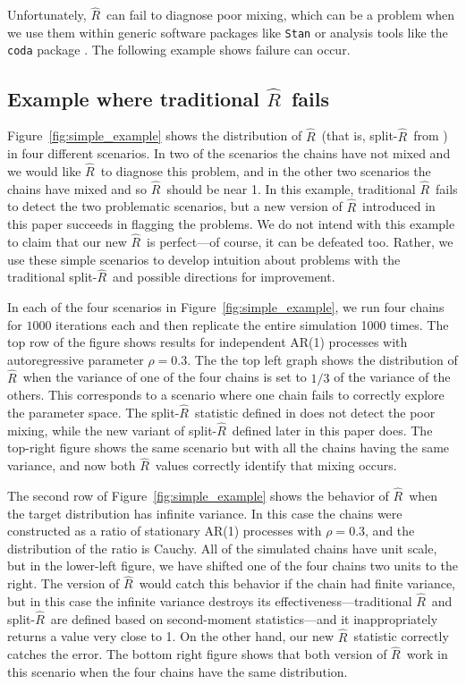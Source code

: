 \documentclass[american,]{article}
\newcommand{\Rhat}{$\widehat{R}$}
\newcommand{\sRhat}{split-$\widehat{R}$}
\theoremstyle{definition}
\begin{document}
Unfortunately, \Rhat\ can fail to diagnose poor mixing, which can be a problem when we use them 
within generic software packages like \texttt{Stan} \citep{Stan:JSS:2017} or 
analysis tools like the \texttt{coda} package \citep{coda2006}. The following example shows
failure can occur.

\subsection{Example where traditional \Rhat\ fails}

  Figure~\ref{fig:simple_example} shows the distribution of \Rhat\  (that is, \sRhat\ from \cite{BDA3})   in four different scenarios.  In two of the scenarios the chains have not mixed and we would like \Rhat\  to diagnose this problem, and in the other two scenarios the chains have mixed and so  \Rhat\ should be near 1.  In this example, traditional \Rhat\  fails to detect the two problematic scenarios, but a new version  of \Rhat\  introduced in this paper succeeds in flagging the problems. We do not intend with this example to claim that our new \Rhat\ is perfect---of course, it can be defeated too.  Rather, we use these simple scenarios to develop intuition about problems with the traditional  \sRhat\  and possible directions for improvement.

In each of the four scenarios in  Figure~\ref{fig:simple_example}, we run four chains for $1000$ iterations each and then replicate the entire simulation 1000 times. The top row of the figure shows results for independent AR(1) processes with autoregressive parameter $\rho=0.3$. The the top left graph shows the distribution of \Rhat\ when the variance of one of the four chains is set to $1/3$ of the variance of the others. This corresponds to a scenario where one chain fails to correctly explore the parameter space. The \sRhat\ statistic defined in \citet{BDA3}  does not detect the poor mixing, while the new variant of \sRhat\ defined later in this paper does. The top-right figure shows the same scenario but with all the chains having the same variance, and now both \Rhat\ values correctly identify that mixing occurs.

The second row of Figure~\ref{fig:simple_example} shows the behavior of \Rhat\ when the target distribution has infinite variance. In this case the chains were constructed as a ratio of stationary AR(1) processes with  $\rho=0.3$, and the distribution of the ratio is Cauchy.  All of the simulated chains have  unit scale, but in the lower-left figure, we have shifted one of the four chains two  units to the right.  The \citet{BDA3} version of \Rhat\ would catch this behavior if the chain had finite variance, but in this case the infinite variance destroys its effectiveness---traditional  \Rhat\ and \sRhat\ are defined based on second-moment statistics---and it inappropriately returns a value very close to 1. On the other hand, our new \Rhat\ statistic correctly catches the error. The bottom right figure shows that both version of \Rhat\ work in this scenario when the four chains have the same distribution. 
  
\end{document}
